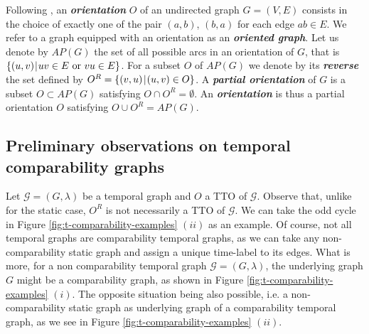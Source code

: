 \documentclass[runningheads]{llncs}
\newcommand{\bfit}[1]{\textbf{\textit{#1}}}
\newcommand{\toremove}[1]{\textcolor{orange}{}}
\begin{document}
Following \cite{GhouilaHouri, hell1995lexicographic}, an \bfit{orientation} $O$ of an undirected graph $G=(V,E)$ consists in the choice of exactly one of the pair $(a, b)$, $(b, a)$ for each edge $ab \in E$. We refer to a graph equipped with an orientation as an \bfit{oriented graph}. Let us denote by $AP(G)$ the set of all possible arcs in an orientation of $G$, that is $\{(u,v) \hspace{0.15ex} | \hspace{0.15ex}  uv\in E \text{ or } vu \in E\}$. For a subset $O$ of $AP(G)$ we denote by its \bfit{reverse} the set defined by $O^{R} = \{(v,u) \hspace{0.25ex} | \hspace{0.15ex} (u,v)\in O\}$. A \bfit{partial orientation} of $G$ is a subset $O\subset AP(G)$ satisfying $O \cap O^{R} = \emptyset$. An \bfit{orientation} is thus a partial orientation $O$ satisfying  $O \cup O^{R} = AP(G)$.



\subsection{Preliminary observations on  temporal comparability graphs}\label{subsect:preliminar-properties}%


Let $\mathcal{G}=(G,\lambda)$ be a temporal graph and $O$ a TTO of $\mathcal{G}$. Observe that, unlike for the static case, $O^{R}$ is not necessarily a TTO of $\mathcal{G}$. We can take the odd cycle in Figure \ref{fig:t-comparability-examples} $(ii)$ as an example. Of course, not all temporal graphs are comparability temporal graphs, as we can take any non-comparability static graph and assign a unique time-label to its edges. What is more, for a non comparability temporal graph $\mathcal{G}=(G,\lambda)$, the underlying graph $G$ might be a comparability graph, as shown in Figure \ref{fig:t-comparability-examples} $(i)$. The opposite situation being also possible, i.e. a non-comparability static graph as underlying graph of a comparability temporal graph, as we see in Figure \ref{fig:t-comparability-examples} $(ii)$.
\end{document}

